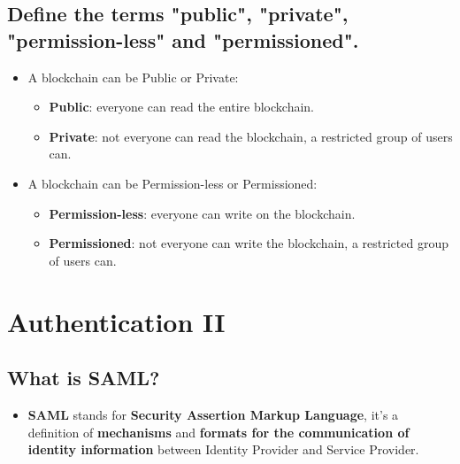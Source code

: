 \documentclass[9pt, letterpaper]{article}
\begin{document}
\subsection{Define the terms "public", "private", "permission-less" and "permissioned".}
\begin{itemize}
	\item A blockchain can be Public or Private:
	\begin{itemize}
		\item \textbf{Public}: everyone can read the entire blockchain.
		\item \textbf{Private}: not everyone can read the blockchain, a restricted group of users can.
	\end{itemize}
	\item A blockchain can be Permission-less or Permissioned:
	\begin{itemize}
		\item \textbf{Permission-less}: everyone can write on the blockchain.
		\item \textbf{Permissioned}: not everyone can write the blockchain, a restricted group of users can.
	\end{itemize}
\end{itemize}

\section{Authentication II}

\subsection{What is SAML?}
\begin{itemize}
	\item \textbf{SAML} stands for \textbf{Security Assertion Markup Language}, it's a definition of \textbf{mechanisms} and \textbf{formats for the communication of identity information} between Identity Provider and Service Provider.
\end{itemize}
\end{document}
